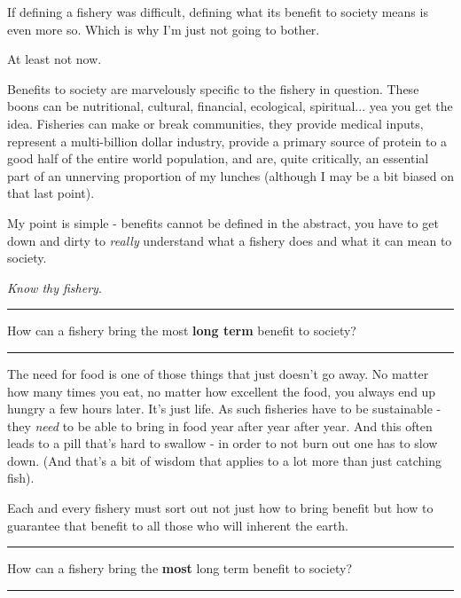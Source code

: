 \documentclass[11pt,a5paper]{book}
\begin{document}
If defining a fishery was difficult, defining what its benefit to society means is even more so. Which is why I'm just not going to bother.
\newline

At least not now.
\newline

Benefits to society are marvelously specific to the fishery in question. These boons can be nutritional, cultural, financial, ecological, spiritual... yea you get the idea. Fisheries can make or break communities, they provide medical inputs, represent a multi-billion dollar industry, provide a primary source of protein to a good half of the entire world population, and are, quite critically, an essential part of an unnerving proportion of my lunches (although I may be a bit biased on that last point).
\newline

My point is simple - benefits cannot be defined in the abstract, you have to get down and dirty to \textit{really} understand what a fishery does and what it can mean to society. 
\newline

\textit{Know thy fishery}.
\newpage


\noindent \rule{\textwidth}{0.5pt} 
\noindent How can a fishery bring the most \textbf{long term} benefit to society?
\newline
\rule{\textwidth}{0.5pt} 
\vspace{5pt}

The need for food is one of those things that just doesn't go away. No matter how many times you eat, no matter how excellent the food, you always end up hungry a few hours later. It's just life. As such fisheries have to be sustainable - they \textit{need} to be able to bring in food year after year after year. And this often leads to a pill that's hard to swallow - in order to not burn out one has to slow down. (And that's a bit of wisdom that applies to a lot more than just catching fish). \newline

Each and every fishery must sort out not just how to bring benefit but how to guarantee that benefit to all those who will inherent the earth.
\newpage


\noindent \rule{\textwidth}{0.5pt} 
\noindent How can a fishery bring the \textbf{most} long term benefit to society?
\newline
\rule{\textwidth}{0.5pt} 
\vspace{5pt}
\end{document}
